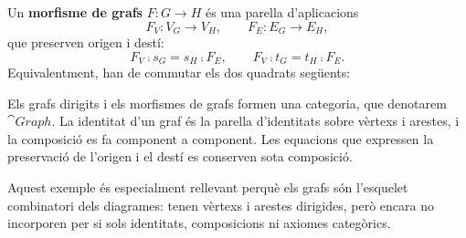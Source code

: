 \begin{definicio}
Un \textbf{morfisme de grafs} $F\colon G\to H$ és una parella d'aplicacions
\[
F_V\colon V_G\to V_H,
\qquad
F_E\colon E_G\to E_H,
\]
que preserven origen i destí:
\[
F_V\comp s_G=s_H\comp F_E,
\qquad
F_V\comp t_G=t_H\comp F_E.
\]
Equivalentment, han de commutar els dos quadrats següents:

\begin{center}
\hspace{2.2em}
\end{center}
\end{definicio}

Els grafs dirigits i els morfismes de grafs formen una categoria, que denotarem $\cat{Graph}$. La identitat d'un graf és la parella d'identitats sobre vèrtexs i arestes, i la composició es fa component a component. Les equacions que expressen la preservació de l'origen i el destí es conserven sota composició.

Aquest exemple és especialment rellevant perquè els grafs són l'esquelet combinatori dels diagrames: tenen vèrtexs i arestes dirigides, però encara no incorporen per si sols identitats, composicions ni axiomes categòrics.

